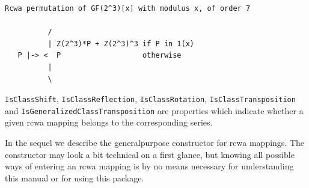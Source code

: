 \documentclass[a4paper,11pt]{report}
\begin{document}
{{{\begin{Verbatim}[commandchars=!@A,fontsize=\small,frame=single,label=Example]
  Rcwa permutation of GF(2^3)[x] with modulus x, of order 7
  
          /
          | Z(2^3)*P + Z(2^3)^3 if P in 1(x)
   P |-> <  P                   otherwise
          |
          \
\end{Verbatim}
 }

      \texttt{IsClassShift}, \texttt{IsClassReflection}, \texttt{IsClassRotation}, \texttt{IsClassTransposition} and \texttt{IsGeneralizedClassTransposition} are properties which indicate whether a given rcwa mapping belongs to the
corresponding series. 

 In the sequel we describe the general\texttt{}purpose constructor
for rcwa mappings. The constructor may look a bit technical on a first glance,
but knowing all possible ways of entering an rcwa mapping is by no means
necessary for understanding this manual or for using this package. 
}}
\end{document}

